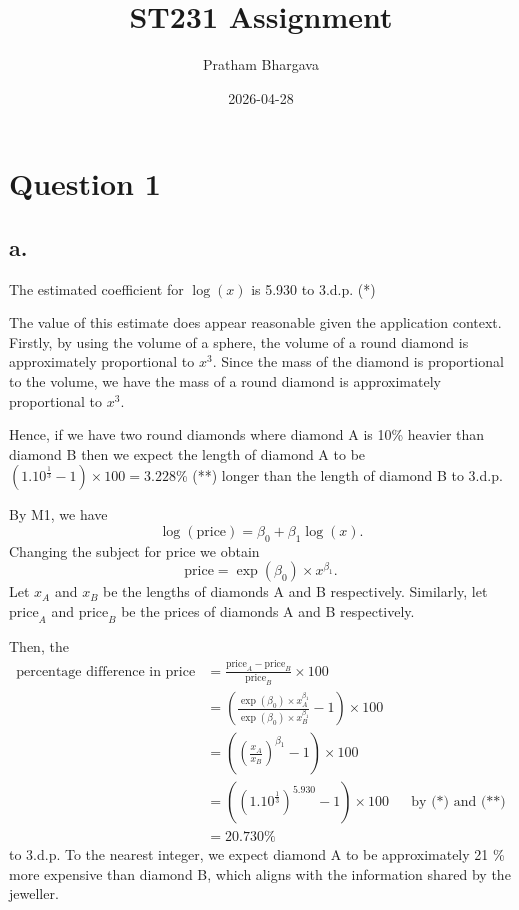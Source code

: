 \documentclass[
  11pt,
]{article}
\title{ST231 Assignment}
\author{Pratham Bhargava}
\date{2026-04-28}
\begin{document}
\maketitle

\section{Question 1}\label{question-1}

\subsection{a.}\label{a.}

The estimated coefficient for \(\log(x)\) is 5.930 to 3.d.p. (*)

The value of this estimate does appear reasonable given the application
context. Firstly, by using the volume of a sphere, the volume of a round
diamond is approximately proportional to \(x^3\). Since the mass of the
diamond is proportional to the volume, we have the mass of a round
diamond is approximately proportional to \(x^3\).

Hence, if we have two round diamonds where diamond A is 10\% heavier
than diamond B then we expect the length of diamond A to be
\((1.10^{\frac{1}{3}} - 1) \times 100 = 3.228\)\% (**) longer than the
length of diamond B to 3.d.p.

By M1, we have \[
  \log(\text{price}) = \beta_0 + \beta_1 \log(x).
\] Changing the subject for price we obtain \[
  \text{price} = \exp(\beta_0) \times x^{\beta_1}.
\] Let \(x_A\) and \(x_B\) be the lengths of diamonds A and B
respectively. Similarly, let \(\text{price}_A\) and \(\text{price}_B\)
be the prices of diamonds A and B respectively.

Then, the \begin{align*}
  \text{percentage difference in price} 
  & = \frac{\text{price}_A - \text{price}_B}{\text{price}_B} \times 100 \\
  & = \left(
        \frac{\exp(\beta_0) \times x_A^{\beta_1}}{\exp(\beta_0) \times x_B^{\beta_1}} - 1
      \right) \times 100 \\
  & = \left(
        \left(
          \frac{x_A}{x_B}
        \right)^{\beta_1} - 1
      \right) \times 100 \\
  & = ((1.10^{\frac{1}{3}})^{5.930} - 1) \times 100 && \text{by (*) and (**)}\\
  & = 20.730\%
\end{align*} to 3.d.p. To the nearest integer, we expect diamond A to be
approximately 21 \% more expensive than diamond B, which aligns with the
information shared by the jeweller.
\end{document}
